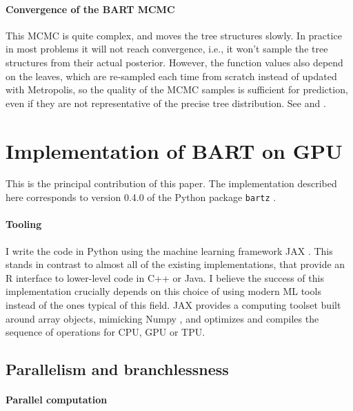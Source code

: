 \documentclass{article}
\begin{document}
    \paragraph{Convergence of the BART MCMC}

    This MCMC is quite complex, and moves the tree structures slowly. In practice in most problems it will not reach convergence, i.e., it won't sample the tree structures from their actual posterior. However, the function values also depend on the leaves, which are re-sampled each time from scratch instead of updated with Metropolis, so the quality of the MCMC samples is sufficient for prediction, even if they are not representative of the precise tree distribution. See \citet[p.~12]{ronen2022} and \citet[p.~4]{tan2024}.

    \section{Implementation of BART on GPU}
    \label{sec:impl}

    This is the principal contribution of this paper. The implementation described here corresponds to version
    0.4.0
    of the Python package \texttt{bartz}
    \citep{petrillo2024b}%
    .

    \paragraph{Tooling}

    I write the code in Python using the machine learning framework JAX \citep{bradbury2018}. This stands in contrast to almost all of the existing implementations, that provide an R interface to lower-level code in C++ or Java. I believe the success of this implementation crucially depends on this choice of using modern ML tools instead of the ones typical of this field. JAX provides a computing toolset built around array objects, mimicking Numpy \citep{harris2020}, and optimizes and compiles the sequence of operations for CPU, GPU or TPU.

    \subsection{Parallelism and branchlessness}
    \label{sec:branchless}

    \paragraph{Parallel computation}
\end{document}
